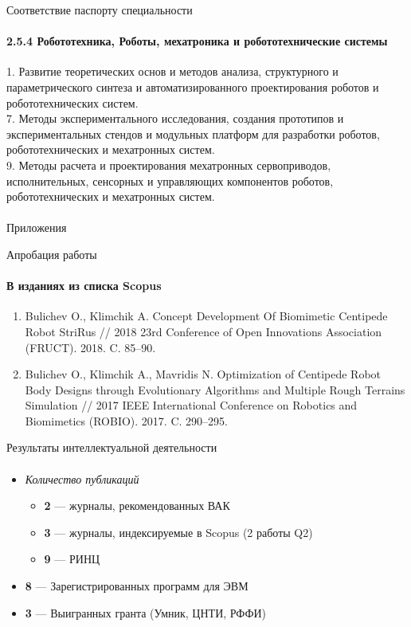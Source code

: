 \documentclass[aspectratio=169,xcolor=table]{beamer}
\begin{document}
\begin{frame}[t]{Соответствие паспорту специальности}
    \framesubtitle{2.5.4 Робототехника, Роботы, мехатроника и
        робототехнические системы}
    1. Развитие теоретических основ и методов анализа, структурного и параметрического синтеза и автоматизированного проектирования роботов и робототехнических систем. \\
    7. Методы экспериментального исследования, создания прототипов и
    экспериментальных стендов и модульных платформ для разработки роботов, робототехнических и мехатронных систем. \\
    9. Методы расчета и проектирования мехатронных сервоприводов,
    исполнительных, сенсорных и управляющих компонентов роботов,
    робототехнических и мехатронных систем.
\end{frame}

\begin{frame}[c]{}
    \framesubtitle{}
    \centering\LARGE Приложения
\end{frame}

\begin{frame}[t]{Апробация работы}
    \framesubtitle{В изданиях из списка Scopus}
    \begin{enumerate}
        \item Bulichev O., Klimchik A. Concept Development Of Biomimetic Centipede Robot StriRus // 2018 23rd Conference of Open Innovations Association (FRUCT). 2018. C. 85–90.
        \item Bulichev O., Klimchik A., Mavridis N. Optimization of Centipede Robot Body Designs through Evolutionary Algorithms and Multiple Rough Terrains Simulation // 2017 IEEE International Conference on Robotics and Biomimetics (ROBIO). 2017. C. 290–295.
    \end{enumerate}
\end{frame}

\begin{frame}[t]{Результаты интеллектуальной деятельности}
    \framesubtitle{}
    \large
    \begin{itemize}
        \item \textit{Количество публикаций}
              \begin{itemize}
                  \large
                  \item \textbf{2} --- журналы, рекомендованных ВАК
                  \item \textbf{3} --- журналы, индексируемые в Scopus (2 работы Q2)
                  \item \textbf{9} --- РИНЦ
              \end{itemize}
        \item \textbf{8} --- Зарегистрированных программ для ЭВМ
        \item \textbf{3} --- Выигранных гранта (Умник, ЦНТИ, РФФИ)
    \end{itemize}
\end{frame}
\end{document}
